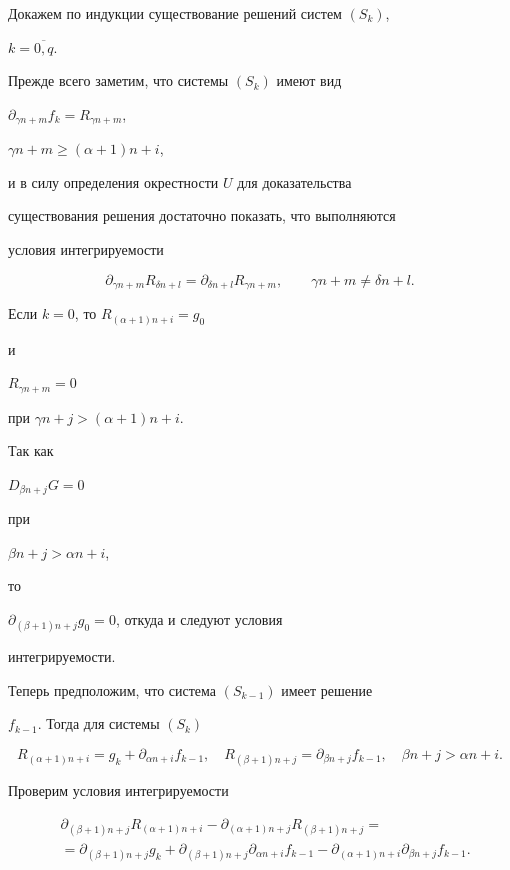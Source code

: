 Докажем по индукции существование решений систем $(S_k)$,


$k=\overline{0,q}$.


Прежде всего заметим, что системы $(S_k)$ имеют вид


$\partial_{\gamma n + m}f_k = R_{\gamma n + m}$,


$\gamma n + m \ge (\alpha + 1) n + i$,


и в силу определения окрестности $U$ для доказательства


существования решения достаточно показать, что выполняются


условия интегрируемости


$$


\partial_{\gamma n + m}R_{\delta n + l} =


\partial_{\delta n + l}R_{\gamma n + m},


\qquad


\gamma n + m \ne \delta n + l.


$$


Если $k=0$, то $R_{(\alpha+1)n + i} = g_0$


и


$R_{\gamma n + m} = 0$


при $\gamma n + j > (\alpha + 1) n + i$.


Так как


$D_{\beta n + j}G = 0$


при


$\beta n + j > \alpha n + i$,


то


$\partial_{(\beta + 1)n + j}g_0 = 0$, откуда и следуют условия


интегрируемости.





Теперь предположим, что система $(S_{k-1})$ имеет решение


$f_{k-1}$. Тогда для системы $(S_k)$


$$


R_{(\alpha + 1)n + i} = g_k + \partial_{\alpha n + i}f_{k-1},


\quad


R_{(\beta  + 1)n + j} = \partial_{\beta n + j}f_{k-1},


\quad


\beta n + j > \alpha n + i.


$$


Проверим условия интегрируемости


\begin{align*}


&\partial_{(\beta + 1)n + j}R_{(\alpha + 1)n + i} -


\partial_{(\alpha + 1)n + j}R_{(\beta + 1)n + j}= \\


&=\partial_{(\beta + 1)n + j}g_k +


\partial_{(\beta + 1)n + j}\partial_{\alpha n + i}f_{k-1} -


\partial_{(\alpha + 1)n + i}\partial_{\beta n + j}f_{k-1}.


\end{align*}


